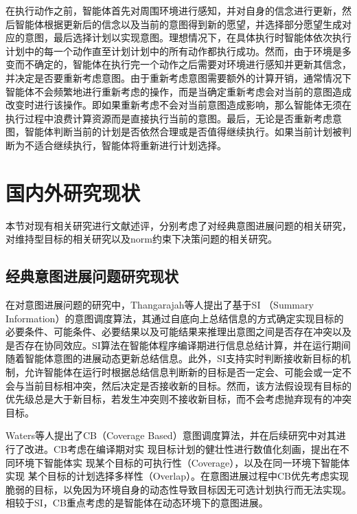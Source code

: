 在执行动作之前，智能体首先对周围环境进行感知，并对自身的信念进行更新，然后智能体根据更新后的信念以及当前的意图得到新的愿望，并选择部分愿望生成对应的意图，最后选择计划以实现意图。理想情况下，在具体执行时智能体依次执行计划中的每一个动作直至计划计划中的所有动作都执行成功。然而，由于环境是多变而不确定的，智能体在执行完一个动作之后需要对环境进行感知并更新其信念，并决定是否要重新考虑意图。由于重新考虑意图需要额外的计算开销，通常情况下智能体不会频繁地进行重新考虑的操作，而是当确定重新考虑会对当前的意图造成改变时进行该操作。即如果重新考虑不会对当前意图造成影响，那么智能体无须在执行过程中浪费计算资源而是直接执行当前的意图。最后，无论是否重新考虑意图，智能体判断当前的计划是否依然合理或是否值得继续执行。如果当前计划被判断为不适合继续执行，智能体将重新进行计划选择。

\section{国内外研究现状}
本节对现有相关研究进行文献述评，分别考虑了对经典意图进展问题的相关研究，对维持型目标的相关研究以及norm约束下决策问题的相关研究。
\subsection{经典意图进展问题研究现状}
在对意图进展问题的研究中，Thangarajah等人\cite{DBLP:journals/jar/ThangarajahP11,DBLP:conf/ijcai/ThangarajahPW03}提出了基于SI （Summary Information）的意图调度算法，其通过自底向上总结信息的方式确定实现目标的必要条件、可能条件、必要结果以及可能结果来推理出意图之间是否存在冲突以及是否存在协同效应。SI算法在智能体程序编译期进行信息总结计算，并在运行期间随着智能体意图的进展动态更新总结信息。此外，SI支持实时判断接收新目标的机制，允许智能体在运行时根据总结信息判断新的目标是否一定会、可能会或一定不会与当前目标相冲突，然后决定是否接收新的目标。然而，该方法假设现有目标的优先级总是大于新目标，若发生冲突则不接收新目标，而不会考虑抛弃现有的冲突目标。

Waters等人\cite{DBLP:conf/atal/WatersPS14,DBLP:conf/aamas/ThangarajahSP12}提出了CB（Coverage Based）意图调度算法，并在后续研究中对其进行了改进\cite{DBLP:journals/aamas/WatersPS15}。CB考虑在编译期对实 现目标计划的健壮性进行数值化刻画，提出在不同环境下智能体实 现某个目标的可执行性（Coverage），以及在同一环境下智能体实现 某个目标的计划选择多样性（Overlap）。在意图进展过程中CB优先考虑实现脆弱的目标，以免因为环境自身的动态性导致目标因无可选计划执行而无法实现。相较于SI，CB重点考虑的是智能体在动态环境下的意图进展。

